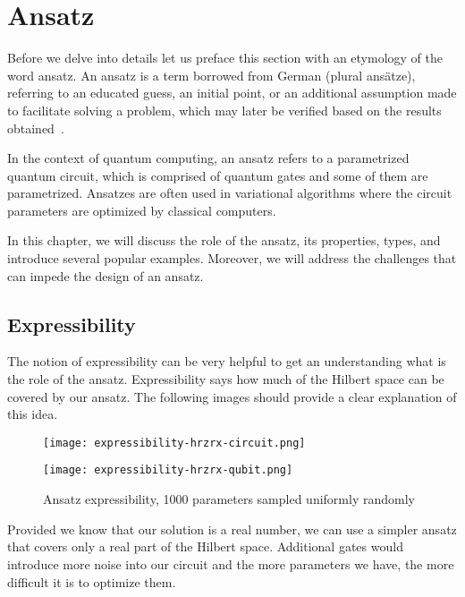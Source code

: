 \chapter{Ansatz}\label{ch:ansatz}
Before we delve into details let us preface this section with an etymology of the word ansatz. An ansatz is a term borrowed from German (plural ansätze), referring to an educated guess, an initial point, or an additional assumption made to facilitate solving a problem, which may later be verified based on the results obtained~\cite{ansatz_etymology}.

In the context of quantum computing, an ansatz refers to a parametrized quantum circuit, which is comprised of quantum gates and some of them are parametrized. Ansatzes are often used in variational algorithms where the circuit parameters are optimized by classical computers.

In this chapter, we will discuss the role of the ansatz, its properties, types, and introduce several popular examples. Moreover, we will address the challenges that can impede the design of an ansatz.

\section{Expressibility}
The notion of expressibility can be very helpful to get an understanding what is the role of the ansatz. Expressibility says how much of the Hilbert space can be covered by our ansatz. The following images should provide a clear explanation of this idea.

\begin{figure}[H]
        \centering
        \begin{minipage}{0.4\linewidth}
            \centering
            \texttt{[image: expressibility-hrzrx-circuit.png]}
        \end{minipage}
        \begin{minipage}{0.4\linewidth}
            \centering
            \texttt{[image: expressibility-hrzrx-qubit.png]}
        \end{minipage}
        \caption{Ansatz expressibility, 1000 parameters sampled uniformly randomly}
\end{figure}

Provided we know that our solution is a real number, we can use a simpler ansatz that covers only a real part of the Hilbert space. Additional gates would introduce more noise into our circuit and the more parameters we have, the more difficult it is to optimize them.

